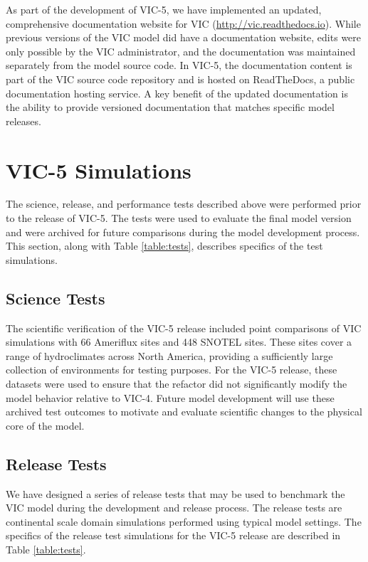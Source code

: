 \documentclass[gmd, manuscript]{copernicus}
\begin{document}
    As part of the development of VIC-5, we have implemented an updated, comprehensive documentation website for VIC (\url{http://vic.readthedocs.io}). While previous versions of the VIC model did have a documentation website, edits were only possible by the VIC administrator, and the documentation was maintained separately from the model source code. In VIC-5, the documentation content is part of the VIC source code repository and is hosted on ReadTheDocs, a public documentation hosting service. A key benefit of the updated documentation is the ability to provide versioned documentation that matches specific model releases.


  \section{VIC-5 Simulations}
    \label{sec:vic-5_simulations}

    The science, release, and performance tests described above were performed prior to the release of VIC-5. The tests were used to evaluate the final model version and were archived for future comparisons during the model development process. This section, along with Table \ref{table:tests}, describes specifics of the test simulations.

    \subsection{Science Tests}

    The scientific verification of the VIC-5 release included point comparisons of VIC simulations with 66 Ameriflux sites \citep{Baldocchi_1996,Baldocchi_2001,Bohn_2016} and 448 SNOTEL sites. These sites cover a range of hydroclimates across North America, providing a sufficiently large collection of environments for testing purposes. For the VIC-5 release, these datasets were used to ensure that the refactor did not significantly modify the model behavior relative to VIC-4. Future model development will use these archived test outcomes to motivate and evaluate scientific changes to the physical core of the model.

    \subsection{Release Tests}

    We have designed a series of release tests that may be used to benchmark the VIC model during the development and release process. The release tests are continental scale domain simulations performed using typical model settings. The specifics of the release test simulations for the VIC-5 release are described in Table \ref{table:tests}.
\end{document}
